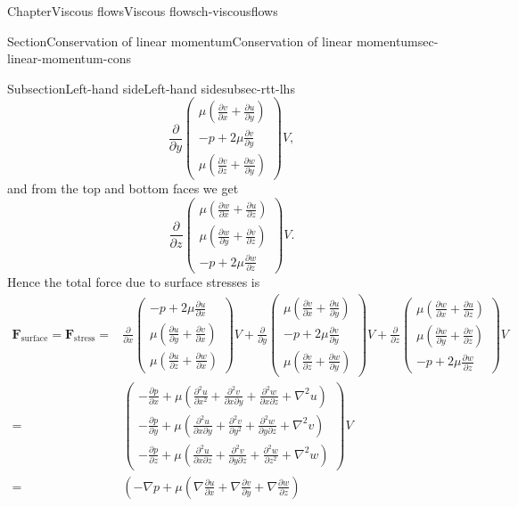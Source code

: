 \documentclass[oneside,10pt,]{book}
\numberwithin{equation}{section}
\newcommand{\pd}[2]{\frac{\partial#1}{\partial#2}}
\newcommand{\bF}{\boldsymbol{F}}
\begin{document}
\begin{chapterptx}{Chapter}{Viscous flows}{}{Viscous flows}{}{}{ch-viscousflows}
\begin{sectionptx}{Section}{Conservation of linear momentum}{}{Conservation of linear momentum}{}{}{sec-linear-momentum-cons}
\begin{subsectionptx}{Subsection}{Left-hand side}{}{Left-hand side}{}{}{subsec-rtt-lhs}
\begin{equation*}
\pd{}{y}\left(\begin{matrix}
\mu\left(\pd{v}{x}+\pd{u}{y}\right)\\
-p+2\mu\pd{v}{y}\\
\mu\left(\pd{v}{z}+\pd{w}{y}\right)
\end{matrix}\right)V,
\end{equation*}
and from the top and bottom faces we get%
\begin{equation*}
\pd{}{z}\left(\begin{matrix}
\mu\left(\pd{w}{x}+\pd{u}{z}\right)\\
\mu\left(\pd{w}{y}+\pd{v}{z}\right)\\
-p+2\mu\pd{w}{z}
\end{matrix}\right)V.
\end{equation*}
Hence the total force due to surface stresses is%
\begin{align*}
\bF_{\textrm{surface}}=\bF_{\textrm{stress}}=&
\pd{}{x}\left(\begin{matrix}
-p+2\mu\pd{u}{x}\\
\mu\left(\pd{u}{y}+\pd{v}{x}\right)\\
\mu\left(\pd{u}{z}+\pd{w}{x}\right)
\end{matrix}\right)V
+\pd{}{y}\left(\begin{matrix}
\mu\left(\pd{v}{x}+\pd{u}{y}\right)\\
-p+2\mu\pd{v}{y}\\
\mu\left(\pd{v}{z}+\pd{w}{y}\right)
\end{matrix}\right)V
+\pd{}{z}\left(\begin{matrix}
\mu\left(\pd{w}{x}+\pd{u}{z}\right)\\
\mu\left(\pd{w}{y}+\pd{v}{z}\right)\\
-p+2\mu\pd{w}{z}
\end{matrix}\right)V\\
=&
\left(\begin{matrix}
-\pd{p}{x}+\mu\left(\pd{^2u}{x^2}+\pd{^2v}{x\partial y}+\pd{^2w}{x\partial z}+\nabla^2u\right)\\
-\pd{p}{y}+\mu\left(\pd{^2u}{x\partial y}+\pd{^2v}{y^2}+\pd{^2w}{y\partial z}+\nabla^2v\right)\\
-\pd{p}{z}+\mu\left(\pd{^2u}{x\partial z}+\pd{^2v}{y\partial z}+\pd{^2w}{z^2}+\nabla^2w\right)
\end{matrix}\right)V\\
=&\left(-\nabla p+\mu\left(\nabla\pd{u}{x}+\nabla\pd{v}{y}+\nabla\pd{w}{z}\right)

\end{align*}
\end{subsectionptx}
\end{sectionptx}
\end{chapterptx}
\end{document}
